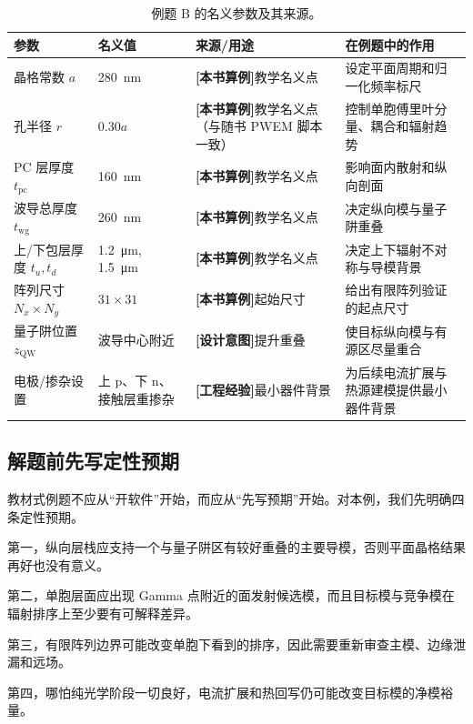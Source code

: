 \begin{table}[htbp]
  \centering
  \footnotesize
  \caption{例题 B 的名义参数及其来源。}
  \label{tab:worked-params}
  \setlength{\tabcolsep}{4pt}
  \begin{tabularx}{\textwidth}{@{}p{2.0cm}p{2.2cm}p{2.8cm}Y@{}}
    \toprule
    参数 & 名义值 & 来源/用途 & 在例题中的作用 \\
    \midrule
    晶格常数 $a$ & \SI{280}{nm} & \textbf{[本书算例]}教学名义点 & 设定平面周期和归一化频率标尺 \\
    孔半径 $r$ & $0.30a$ & \textbf{[本书算例]}教学名义点（与随书 PWEM 脚本一致） & 控制单胞傅里叶分量、耦合和辐射趋势 \\
    PC 层厚度 $t_{\mathrm{pc}}$ & \SI{160}{nm} & \textbf{[本书算例]}教学名义点 & 影响面内散射和纵向剖面 \\
    波导总厚度 $t_{\mathrm{wg}}$ & \SI{260}{nm} & \textbf{[本书算例]}教学名义点 & 决定纵向模与量子阱重叠 \\
    上/下包层厚度 $t_u,t_d$ & \SI{1.2}{\micro\meter}, \SI{1.5}{\micro\meter} & \textbf{[本书算例]}教学名义点 & 决定上下辐射不对称与导模背景 \\
    阵列尺寸 $N_x\times N_y$ & $31\times31$ & \textbf{[本书算例]}起始尺寸 & 给出有限阵列验证的起点尺寸 \\
    量子阱位置 $z_{\mathrm{QW}}$ & 波导中心附近 & \textbf{[设计意图]}提升重叠 & 使目标纵向模与有源区尽量重合 \\
    电极/掺杂设置 & 上 p、下 n、接触层重掺杂 & \textbf{[工程经验]}最小器件背景 & 为后续电流扩展与热源建模提供最小器件背景 \\
    \bottomrule
  \end{tabularx}
\end{table}

\subsection{解题前先写定性预期}
教材式例题不应从“开软件”开始，而应从“先写预期”开始。对本例，我们先明确四条定性预期。

第一，纵向层栈应支持一个与量子阱区有较好重叠的主要导模，否则平面晶格结果再好也没有意义。

第二，单胞层面应出现 Gamma 点附近的面发射候选模，而且目标模与竞争模在辐射排序上至少要有可解释差异。

第三，有限阵列边界可能改变单胞下看到的排序，因此需要重新审查主模、边缘泄漏和远场。

第四，哪怕纯光学阶段一切良好，电流扩展和热回写仍可能改变目标模的净模裕量。

